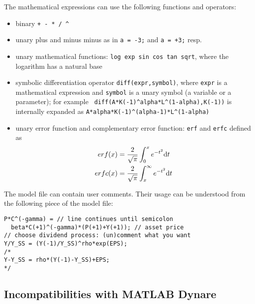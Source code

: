 \documentclass[10pt]{article}
\begin{document}
The mathematical expressions can use the following functions and operators:
\begin{itemize}
\item binary {\tt + - * / \verb|^|}
\item unary plus and minus minus as in {\tt a = -3;} and {\tt a = +3;} resp.
\item unary mathematical functions: {\tt log exp sin cos tan
sqrt}, whe\-re the logarithm has a natural base
\item symbolic differentiation operator {\tt diff(expr,symbol)}, where
{\tt expr} is a mathematical expression and {\tt symbol} is a unary
symbol (a variable or a parameter); for example {\tt
  diff(A*K(-1)\verb|^|alpha*L\verb|^|(1-alpha),K(-1))} is internally expanded as
{\tt A*alpha*K(-1)\verb|^|(alpha-1)*L\verb|^|(1-alpha)}
\item unary error function and complementary error function: {\tt erf}
and {\tt erfc} defined as
\begin{eqnarray*}
erf(x) &= \frac{2}{\sqrt{\pi}}\int_0^x e^{-t^2}{\rm d}t\\
erfc(x)&= \frac{2}{\sqrt{\pi}}\int_x^\infty e^{-t^2}{\rm d}t
\end{eqnarray*}
\end{itemize}

The model file can contain user comments. Their usage can be
understood from the following piece of the model file:

{\small
\begin{verbatim}
P*C^(-gamma) = // line continues until semicolon
  beta*C(+1)^(-gamma)*(P(+1)+Y(+1)); // asset price
// choose dividend process: (un)comment what you want
Y/Y_SS = (Y(-1)/Y_SS)^rho*exp(EPS);
/*
Y-Y_SS = rho*(Y(-1)-Y_SS)+EPS;
*/
\end{verbatim}
}

\subsection{Incompatibilities with MATLAB Dynare}
\end{document}
